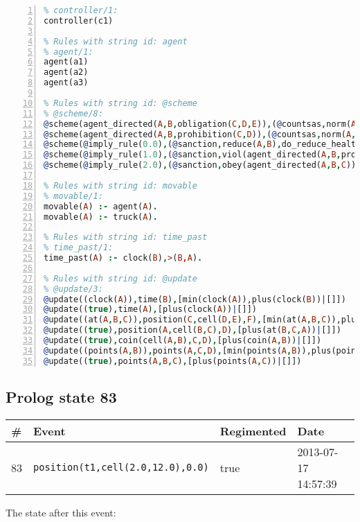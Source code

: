 \documentclass[11pt]{article}\usepackage[utf8]{inputenc}\usepackage{geometry}
\begin{document}
\begin{lstlisting}[language=Prolog, numbers=left]
% Rules with string id: controller
% controller/1:
controller(c1)

% Rules with string id: agent
% agent/1:
agent(a1)
agent(a2)
agent(a3)

% Rules with string id: @scheme
% @scheme/8:
@scheme(agent_directed(A,B,obligation(C,D,E)),(@countsas,norm(A,B,F,obligation(C,D,E)),F),false,(listTrue(C)),(time_past(D)),false,[plus(viol(agent_directed(A,B,obligation(C,D,E))))|[]],[plus(obey(agent_directed(A,B,obligation(C,D,E))))|[]])
@scheme(agent_directed(A,B,prohibition(C,D)),(@countsas,norm(A,B,E,prohibition(C,D)),E),(listTrue(C)),false,(false),false,[plus(viol(agent_directed(A,B,prohibition(C,D))))|[]],[plus(obey(agent_directed(A,B,prohibition(C,D))))|[]])
@scheme(@imply_rule(0.0),(@sanction,reduce(A,B),do_reduce_health(A,B),notifyAgent(A,changed(status))),true,false,false,false,[min(reduce(A,B))|[]],[])
@scheme(@imply_rule(1.0),(@sanction,viol(agent_directed(A,B,prohibition(C,D))),do_sanction(D)),true,false,false,false,[min(viol(agent_directed(A,B,prohibition(C,D))))|[]],[])
@scheme(@imply_rule(2.0),(@sanction,obey(agent_directed(A,B,C))),true,false,false,false,[min(obey(agent_directed(A,B,C)))|[]],[])

% Rules with string id: movable
% movable/1:
movable(A) :- agent(A).
movable(A) :- truck(A).

% Rules with string id: time_past
% time_past/1:
time_past(A) :- clock(B),>(B,A).

% Rules with string id: @update
% @update/3:
@update((clock(A)),time(B),[min(clock(A)),plus(clock(B))|[]])
@update((true),time(A),[plus(clock(A))|[]])
@update((at(A,B,C)),position(C,cell(D,E),F),[min(at(A,B,C)),plus(at(D,E,C))|[]])
@update((true),position(A,cell(B,C),D),[plus(at(B,C,A))|[]])
@update((true),coin(cell(A,B),C,D),[plus(coin(A,B))|[]])
@update((points(A,B)),points(A,C,D),[min(points(A,B)),plus(points(A,D))|[]])
@update((true),points(A,B,C),[plus(points(A,C))|[]])

\end{lstlisting}
\clearpage 
\subsection{Prolog state 83}
\begin{table}[ht]
\centering 
\begin{tabular}{l l l l} 
\textbf{\#} & \textbf{Event} & \textbf{Regimented} & \textbf{Date} \\ [0.5ex] 
\hline
83&\texttt{position(t1,cell(2.0,12.0),0.0)}&true&2013-07-17 14:57:39\\ [1ex] \hline\end{tabular}
\end{table}
The state after this event:
\end{document}
